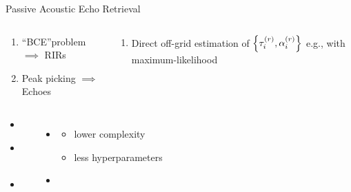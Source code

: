 \begin{frame}[t]{\alert{Passive} Acoustic Echo Retrieval \hfill\faPalette}
        \vspace{.5em}
        \begin{columns}[T,onlytextwidth] %
            \begin{column}{.48\textwidth}
                \small
                \begin{enumerate}
                    \item ``BCE''\footnotemark[1] problem $\implies$ RIRs
                    \item Peak picking $\implies$ Echoes
                \end{enumerate}
            \end{column}
            \begin{column}{.48\textwidth}
                \small
                \begin{enumerate}
                    \item Direct off-grid estimation of $\set{\tauir, \ampir}$
                    e.g., with maximum-likelihood
                \end{enumerate}
            \end{column}%
        \end{columns}

        \vspace{1em}
        \begin{columns}[T,onlytextwidth] %
                \small
                \begin{itemize}
                    \item[\cmark] 
                    \item[\cmark] 
                    \\{\scriptsize~\cite{crocco2016estimation}}
                    \item[\cmark] 
                \end{itemize}
                \small
                \begin{itemize}
                    \item[\cmark] 
                    \begin{itemize}
                        \item lower complexity
                        \item less hyperparameters
                    \end{itemize}
                    \item[\cmark] 
                    \\
                    \end{itemize}
        \end{columns}


\end{frame}
